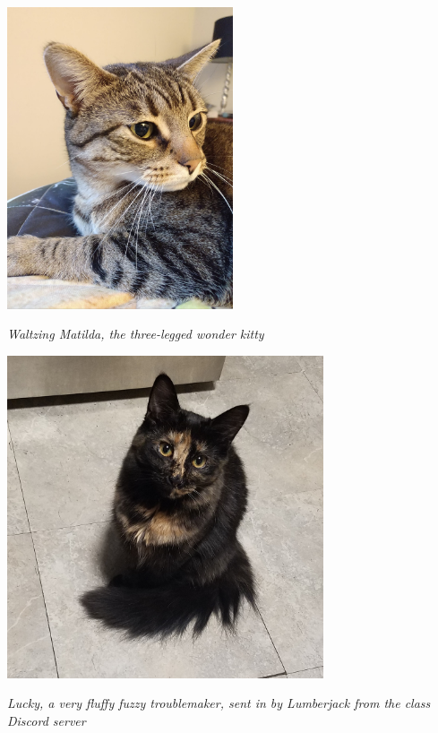 \documentclass[12pt]{article}
\begin{document}
\begin{minipage}{0.5\textwidth}
\begin{center}
\includegraphics[width=0.5\textwidth]{matilda.jpg}

\scriptsize \it Waltzing Matilda, the three-legged wonder kitty
\end{center}
\end{minipage}
\begin{minipage}{0.5\textwidth}
	\begin{center}
\includegraphics[width=0.7\textwidth]{lucky.jpg}

\scriptsize \it Lucky, a very fluffy fuzzy troublemaker, sent in by Lumberjack from the class Discord server
\end{center}
\end{minipage}


\newpage
\end{document}
